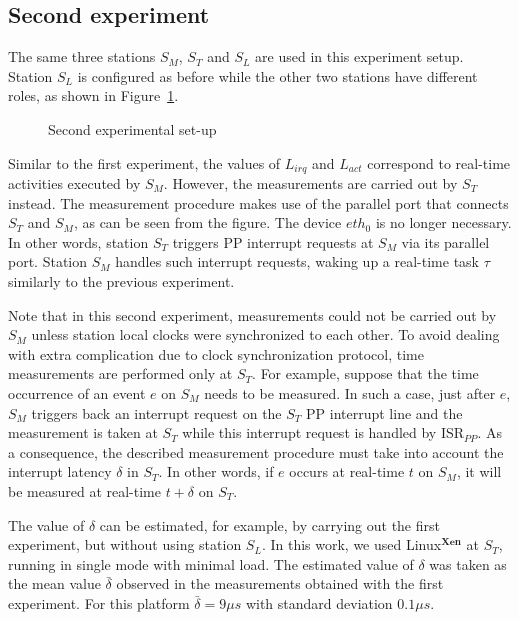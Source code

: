\documentclass{acm_proc_article-sp}
\begin{document}
\begin{figure*}[t]
  \centering {\scalebox{1}{}}
  \caption{Interrupt and activation latencies measurement at station $S_M$ for the
    second experiment}
  \label{fig:dispExp2}
\end{figure*}

\subsection{Second experiment}
\label{sec:exp2}

The same three stations $S_M$, $S_T$ and $S_L$ are used in this experiment
setup. Station $S_L$ is configured as before while the other 
two stations have different roles, as shown in Figure~\ref{fig:config2}.

\begin{figure}[htb]
  \centering {\scalebox{0.67}{}}
  \caption{Second experimental set-up}
  \label{fig:config2}
\end{figure}


Similar to the first experiment, the values of $L_{irq}$ and $L_{act}$ correspond to
real-time activities executed by $S_M$. However, the measurements are carried out by
$S_T$ instead. The measurement procedure makes use of the parallel port that
connects $S_T$ and $S_M$, as can be seen from the figure.  The device $eth_0$ is no
longer necessary.  In other words, station $S_T$ triggers PP interrupt requests at
$S_M$ via its parallel port. Station $S_M$ handles such interrupt requests, waking
up a real-time task $\tau$ similarly to the previous experiment.

Note that in this second experiment, measurements could not be carried out by $S_M$
unless station local clocks were synchronized to each other. To avoid dealing with
extra complication due to clock synchronization protocol, time measurements are
performed only at $S_T$.  For example, suppose that the time occurrence of an event
$e$ on $S_M$ needs to be measured. In such a case, just after $e$,
$S_M$ triggers back an interrupt request on the $S_T$ PP interrupt line and the
measurement is taken at $S_T$ while this interrupt request is handled by ISR$_{PP}$.
As a consequence, the described measurement procedure must take into account the
interrupt latency $\delta$ in $S_T$. In other words, if $e$ occurs at real-time $t$
on $S_M$, it will be measured at real-time $t+ \delta$ on $S_T$.

The value of $\delta$ can be estimated, for example, by carrying out the first
experiment, but without using station $S_L$. In this work, we used
Linux$^{\mathbf{Xen}}$ at $S_T$, running in single mode with minimal load. The
estimated value of $\delta$ was taken as the mean value $\bar{\delta}$ observed in
the measurements obtained with the first experiment. For this platform
$\bar{\delta} = 9 \mu s$ with standard deviation $0.1 \mu s$.
\end{document}
